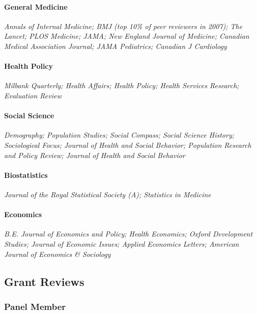 \documentclass[
  letterpaper,
  DIV=11,
  numbers=noendperiod]{scrartcl}
\let\oldparagraph\paragraph
\renewcommand{\paragraph}[1]{\oldparagraph{#1}\mbox{}}
\begin{document}
\paragraph{General Medicine}\label{general-medicine}

\emph{Annals of Internal Medicine; BMJ (top 10\% of peer reviewers in
2007); The Lancet; PLOS Medicine; JAMA; New England Journal of Medicine;
Canadian Medical Association Journal; JAMA Pediatrics; Canadian J
Cardiology}

\paragraph{Health Policy}\label{health-policy}

\emph{Milbank Quarterly; Health Affairs; Health Policy; Health Services
Research; Evaluation Review}

\paragraph{Social Science}\label{social-science}

\emph{Demography; Population Studies; Social Compass; Social Science
History; Sociological Focus; Journal of Health and Social Behavior;
Population Research and Policy Review; Journal of Health and Social
Behavior}

\paragraph{Biostatistics}\label{biostatistics}

\emph{Journal of the Royal Statistical Society (A); Statistics in
Medicine}

\paragraph{Economics}\label{economics}

\emph{B.E. Journal of Economics and Policy; Health Economics; Oxford
Development Studies; Journal of Economic Issues; Applied Economics
Letters; American Journal of Economics \& Sociology}

\subsection{Grant Reviews}\label{grant-reviews}

\subsubsection{Panel Member}\label{panel-member}
\end{document}
